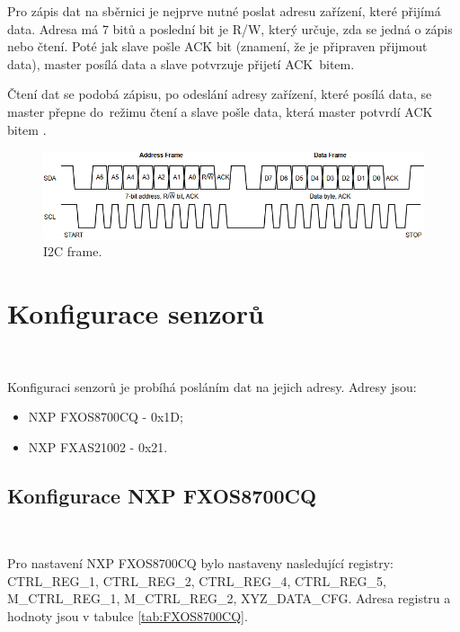 Pro zápis dat na sběrnici je nejprve nutné poslat adresu zařízení, které přijímá
data. Adresa má 7 bitů a poslední bit je R/W, který určuje, zda se jedná o zápis
nebo čtení. Poté jak slave pošle ACK bit (znamení, že je připraven přijmout data),
master posílá data a slave potvrzuje přijetí ACK~bitem.

Čtení dat se podobá zápisu, po odeslání adresy zařízení, které posílá data, se
master přepne do~režimu čtení a slave pošle data, která master potvrdí ACK
bitem \cite{I2C}.

\begin{figure}[!h]
    \centering
    \includegraphics[width = .9\linewidth]{Figures/I2C_FRAME.png}
    \caption{I2C frame\cite{I2C}.}
    \label{fig:I2C_FRAME}
\end{figure}

\section{Konfigurace senzorů}\

Konfiguraci senzorů je probíhá posláním dat na jejich adresy. Adresy
jsou:
\begin{itemize}
    \item NXP FXOS8700CQ - 0x1D;
    \item NXP FXAS21002 - 0x21.
\end{itemize}

\subsection{Konfigurace NXP FXOS8700CQ}\

Pro nastavení NXP FXOS8700CQ bylo nastaveny nasledující registry: CTRL\_REG\_1,
CTRL\_REG\_2, CTRL\_REG\_4, CTRL\_REG\_5, M\_CTRL\_REG\_1, M\_CTRL\_REG\_2,
XYZ\_DATA\_CFG. Adresa registru a hodnoty jsou v tabulce \ref{tab:FXOS8700CQ}.

